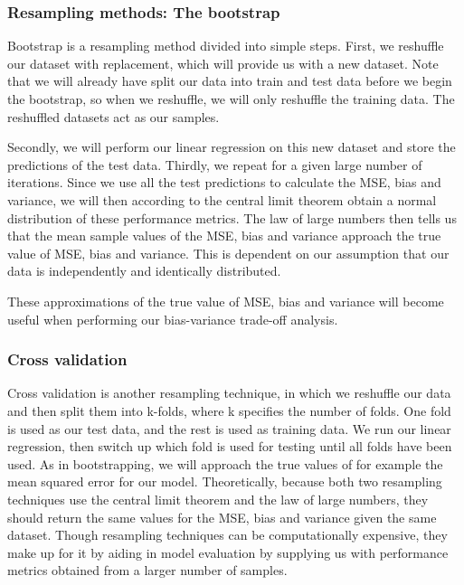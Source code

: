 \documentclass[twocolumn,10pt,cleanfoot]{asme2ej}
\begin{document}
\subsubsection{Resampling methods: The bootstrap}

Bootstrap is a resampling method divided into simple steps. First, we reshuffle our dataset with replacement, which will provide us with a new dataset. Note that we will already have split our data into train and test data before we begin the bootstrap, so when we reshuffle, we will only reshuffle the training data. The reshuffled datasets act as our samples.

Secondly, we will perform our linear regression on this new dataset and store the predictions of the test data. Thirdly, we repeat for a given large number of iterations. Since we use all the test predictions to calculate the MSE, bias and variance, we will then according to the central limit theorem \cite{CLT} obtain a normal distribution of these performance metrics. The law of large numbers \cite{LLN} then tells us that the mean sample values of the MSE, bias and variance approach the true value of MSE, bias and variance. This is dependent on our assumption that our data is independently and identically distributed.

These approximations of the true value of MSE, bias and variance will become useful when performing our bias-variance trade-off analysis.


\subsubsection{Cross validation}

Cross validation is another resampling technique, in which we reshuffle our data and then split them into k-folds, where k specifies the number of folds. One fold is used as our test data, and the rest is used as training data. We run our linear regression, then switch up which fold is used for testing until all folds have been used. As in bootstrapping, we will approach the true values of for example the mean squared error for our model. 
Theoretically, because both two resampling techniques use the central limit theorem and the law of large numbers, they should return the same values for the MSE, bias and variance given the same dataset. Though resampling techniques can be computationally expensive, they make up for it by aiding in model evaluation by supplying us with performance metrics obtained from a larger number of samples. 
\end{document}
